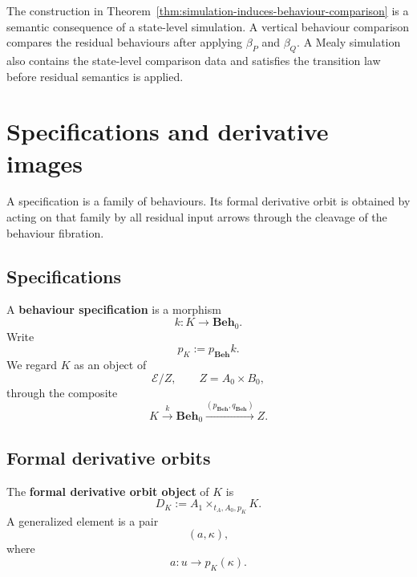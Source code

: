 \begin{remark}
\label{rem:simulation-to-comparison-not-equivalence}
    The construction in Theorem~\ref{thm:simulation-induces-behaviour-comparison} is a semantic consequence of a state-level simulation. A vertical behaviour comparison compares the residual behaviours after applying \(\beta_P\) and \(\beta_Q\). A Mealy simulation also contains the state-level comparison data and satisfies the transition law before residual semantics is applied.
\end{remark}

\section{Specifications and derivative images}
\label{sec:specifications-and-derivative-images}

A specification is a family of behaviours. Its formal derivative orbit is obtained by acting on that family by all residual input arrows through the cleavage of the behaviour fibration.

\subsection{Specifications}
\label{subsec:specifications}

\begin{definition}
\label{def:behaviour-specification}
    A \textbf{behaviour specification} is a morphism
    \[
        k:K\to\mathbf{Beh}_0.
    \]
    Write
    \[
        p_K:=p_{\mathbf{Beh}}k.
    \]
    We regard \(K\) as an object of
    \[
        \mathcal E/Z,
        \qquad
        Z=A_0\times B_0,
    \]
    through the composite
    \[
        K
            \xrightarrow{k}
        \mathbf{Beh}_0
            \xrightarrow{(p_{\mathbf{Beh}},q_{\mathbf{Beh}})}
        Z.
    \]
\end{definition}

\subsection{Formal derivative orbits}
\label{subsec:formal-derivative-orbits}

\begin{definition}
\label{def:formal-derivative-orbit}
    The \textbf{formal derivative orbit object} of \(K\) is
    \[
        D_K:=A_1\times_{t_A,A_0,p_K}K.
    \]
    A generalized element is a pair
    \[
        (a,\kappa),
    \]
    where
    \[
        a:u\to p_K(\kappa).
    \]
\end{definition}

